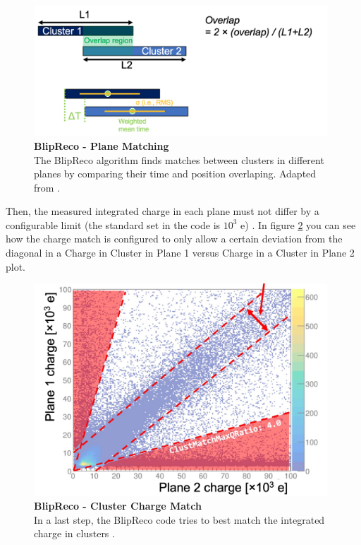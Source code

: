 \begin{figure}[h!]
    \centering
    \includegraphics[width=110mm]{Figures/blip_cluster_match.png}
    \caption[BlipReco - Plane Matching]{{\textbf{BlipReco - Plane Matching}}\\ The BlipReco algorithm finds matches between clusters in different planes by comparing their time and position overlaping. Adapted from \cite{will_CM_Aug}.}
    \label{plane-matching}
\end{figure}

 Then, the measured integrated charge in each plane must not differ by a configurable limit (the standard set in the code is $10^3$ e) \cite{will_CM_Aug}. In figure \ref{charge_match} you can see how the charge match is configured to only allow a certain deviation from the diagonal in a Charge in Cluster in Plane 1 versus Charge in a Cluster in Plane 2 plot.

\begin{figure}[h!]
    \centering
    \includegraphics[width=110mm]{Figures/blip_charge_match.png}
    \caption[BlipReco - Cluster Charge Match]{{\textbf{BlipReco - Cluster Charge Match}}\\ In a last step, the BlipReco code tries to best match the integrated charge in clusters \cite{will_CM_Aug}.}
    \label{charge_match}
\end{figure}

